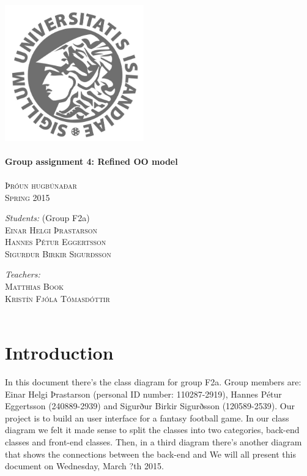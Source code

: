 \documentclass{article}
\begin{document}
\begin{titlepage}
\begin{center}
\textsc{}\\[2cm] 
\includegraphics[width=6cm]{Haskoli_Islands_rett.jpg}\\[0.5cm]
\HRule \\[0.6cm]
{ \huge \bfseries Group assignment 4: Refined OO model}\\[0.2cm]
\HRule \\[0.4cm]
\textsc{\normalsize Þróun hugbúnaðar} \\
\textsc{Spring 2015} \\[1.5cm]
\begin{minipage}{0.45\textwidth}
\begin{flushleft} \large
\textit{Students:} (Group F2a)\\
\textsc{Einar Helgi Þrastarson} \\
\textsc{Hannes Pétur Eggertsson} \\
\textsc{Sigurður Birkir Sigurðsson} \\
\end{flushleft}
\end{minipage}
\begin{minipage}{0.45\textwidth}
\begin{flushright} \large
\textit{Teachers:} \\
\textsc{Matthias Book}\\
\textsc{Kristín Fjóla Tómasdóttir}\\
\textsc{ }\\
\end{flushright}
\end{minipage}

\end{center}
\end{titlepage}


\section{Introduction}
In this document there's the class diagram for group F2a. Group members are: Einar Helgi Þrastarson (personal ID number: 110287-2919), Hannes Pétur Eggertsson (240889-2939) and Sigurður Birkir Sigurðsson (120589-2539). Our project is to build an user interface for a fantasy football game. In our class diagram we felt it made sense to split the classes into two categories, back-end classes and front-end classes. Then, in a third diagram there's another diagram that shows the connections between the back-end and  We will all present this document on Wednesday, March ?th 2015.
\end{document}
